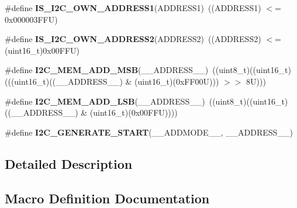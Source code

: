 \begin{DoxyCompactItemize}
\item 
\mbox{\label{group___i2_c___private___macro_gad84e8b9523d45b6105b4d5cb68994a79}} 
\#define {\bfseries I\+S\+\_\+\+I2\+C\+\_\+\+O\+W\+N\+\_\+\+A\+D\+D\+R\+E\+S\+S1}(A\+D\+D\+R\+E\+S\+S1)~((A\+D\+D\+R\+E\+S\+S1) $<$= 0x000003\+F\+F\+U)
\item 
\mbox{\label{group___i2_c___private___macro_ga83001d53612b83ee90730d3bb2732537}} 
\#define {\bfseries I\+S\+\_\+\+I2\+C\+\_\+\+O\+W\+N\+\_\+\+A\+D\+D\+R\+E\+S\+S2}(A\+D\+D\+R\+E\+S\+S2)~((A\+D\+D\+R\+E\+S\+S2) $<$= (uint16\+\_\+t)0x00\+F\+F\+U)
\item 
\mbox{\label{group___i2_c___private___macro_ga2e42fa55be22240dc5a54a0304d01cfb}} 
\#define {\bfseries I2\+C\+\_\+\+M\+E\+M\+\_\+\+A\+D\+D\+\_\+\+M\+SB}(\+\_\+\+\_\+\+A\+D\+D\+R\+E\+S\+S\+\_\+\+\_\+)~((uint8\+\_\+t)((uint16\+\_\+t)(((uint16\+\_\+t)((\+\_\+\+\_\+\+A\+D\+D\+R\+E\+S\+S\+\_\+\+\_\+) \& (uint16\+\_\+t)(0x\+F\+F00\+U))) $>$$>$ 8\+U)))
\item 
\mbox{\label{group___i2_c___private___macro_ga9c8f1a763307d0c37bb4e2dcfdf3bb9f}} 
\#define {\bfseries I2\+C\+\_\+\+M\+E\+M\+\_\+\+A\+D\+D\+\_\+\+L\+SB}(\+\_\+\+\_\+\+A\+D\+D\+R\+E\+S\+S\+\_\+\+\_\+)~((uint8\+\_\+t)((uint16\+\_\+t)((\+\_\+\+\_\+\+A\+D\+D\+R\+E\+S\+S\+\_\+\+\_\+) \& (uint16\+\_\+t)(0x00\+F\+F\+U))))
\item 
\#define {\bfseries I2\+C\+\_\+\+G\+E\+N\+E\+R\+A\+T\+E\+\_\+\+S\+T\+A\+RT}(\+\_\+\+\_\+\+A\+D\+D\+M\+O\+D\+E\+\_\+\+\_\+,  \+\_\+\+\_\+\+A\+D\+D\+R\+E\+S\+S\+\_\+\+\_\+)
\end{DoxyCompactItemize}


\subsection{Detailed Description}


\subsection{Macro Definition Documentation}
\mbox{\label{group___i2_c___private___macro_ga5212d1dbe376d10b7ec3060032283a33}} 
